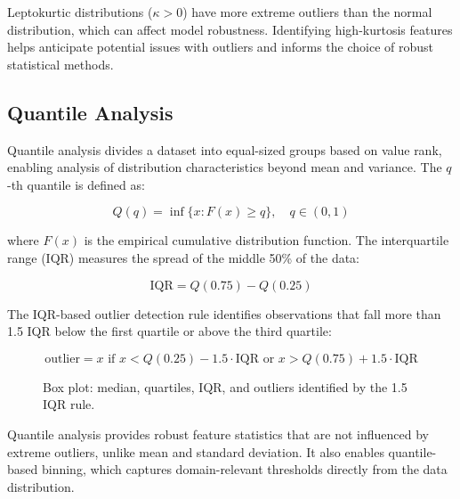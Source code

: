 \documentclass[10pt,a4paper]{article}
\begin{document}
Leptokurtic distributions ($\kappa > 0$) have more extreme outliers than the normal distribution, which can affect model robustness. Identifying high-kurtosis features helps anticipate potential issues with outliers and informs the choice of robust statistical methods.

\subsection{Quantile Analysis}
\label{sec:quantile-analysis}

Quantile analysis divides a dataset into equal-sized groups based on value rank, enabling analysis of distribution characteristics beyond mean and variance. The $q$-th quantile is defined as:

\begin{equation}
Q(q) = \inf\{x : F(x) \geq q\}, \quad q \in (0, 1)
\label{eq:quantile}
\end{equation}

where $F(x)$ is the empirical cumulative distribution function. The interquartile range (IQR) measures the spread of the middle 50\% of the data:

\begin{equation}
\text{IQR} = Q(0.75) - Q(0.25)
\label{eq:iqr}
\end{equation}

The IQR-based outlier detection rule identifies observations that fall more than 1.5 IQR below the first quartile or above the third quartile:

\begin{equation}
\text{outlier} = x \text{ if } x < Q(0.25) - 1.5 \cdot \text{IQR} \text{ or } x > Q(0.75) + 1.5 \cdot \text{IQR}
\label{eq:iqr-outlier}
\end{equation}

\begin{figure}[H]
    \centering
    \caption{Box plot: median, quartiles, IQR, and outliers identified by the 1.5 IQR rule.}
    \label{fig:box-plot}
\end{figure}

Quantile analysis provides robust feature statistics that are not influenced by extreme outliers, unlike mean and standard deviation. It also enables quantile-based binning, which captures domain-relevant thresholds directly from the data distribution.
\end{document}
